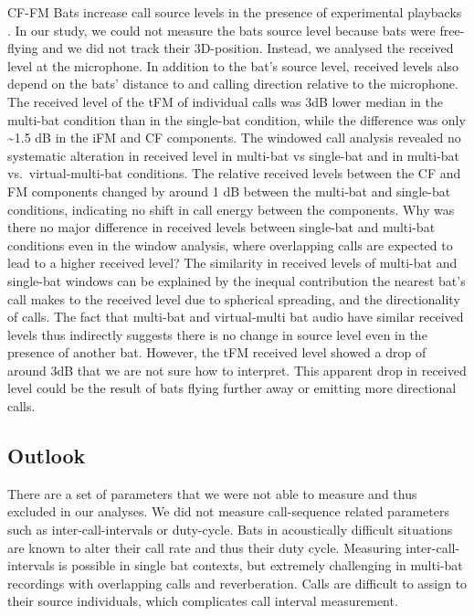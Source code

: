 \documentclass[
]{book}
\begin{document}
CF-FM Bats increase call source levels in the presence of experimental playbacks \citep{hage2013ambient, hage2014ambient, lu2020echolocating}. In our study, we could not measure the bats source level because bats were free-flying and we did not track their 3D-position. Instead, we analysed the received level at the microphone. In addition to the bat's source level, received levels also depend on the bats' distance to and calling direction relative to the microphone. The received level of the tFM of individual calls was 3dB lower median in the multi-bat condition than in the single-bat condition, while the difference was only \textasciitilde1.5 dB in the iFM and CF components. The windowed call analysis revealed no systematic alteration in received level in multi-bat vs single-bat and in multi-bat vs.~virtual-multi-bat conditions. The relative received levels between the CF and FM components changed by around 1 dB between the multi-bat and single-bat conditions, indicating no shift in call energy between the components. Why was there no major difference in received levels between single-bat and multi-bat conditions even in the window analysis, where overlapping calls are expected to lead to a higher received level? The similarity in received levels of multi-bat and single-bat windows can be explained by the inequal contribution the nearest bat's call makes to the received level due to spherical spreading, and the directionality of calls. The fact that multi-bat and virtual-multi bat audio have similar received levels thus indirectly suggests there is no change in source level even in the presence of another bat. However, the tFM received level showed a drop of around 3dB that we are not sure how to interpret. This apparent drop in received level could be the result of bats flying further away or emitting more directional calls.

\hypertarget{outlook}{%
\subsection{Outlook}\label{outlook}}

There are a set of parameters that we were not able to measure and thus excluded in our analyses. We did not measure call-sequence related parameters such as inter-call-intervals or duty-cycle. Bats in acoustically difficult situations are known to alter their call rate \citep{amichai2015calling, jarvis2013groups} and thus their duty cycle. Measuring inter-call-intervals is possible in single bat contexts, but extremely challenging in multi-bat recordings with overlapping calls and reverberation. Calls are difficult to assign to their source individuals, which complicates call interval measurement.
\end{document}
